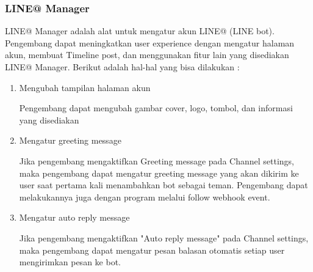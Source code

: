 \subsubsection{LINE@ Manager}
LINE@ Manager adalah alat untuk mengatur akun LINE@ (LINE bot). Pengembang dapat meningkatkan user experience dengan mengatur halaman akun, membuat Timeline post, dan menggunakan fitur lain yang disediakan LINE@ Manager. Berikut adalah hal-hal yang bisa dilakukan :
\begin{enumerate}
\item Mengubah tampilan halaman akun

Pengembang dapat mengubah gambar cover, logo, tombol, dan informasi yang disediakan

\item Mengatur greeting message

Jika pengembang mengaktifkan Greeting message pada Channel settings, maka pengembang dapat mengatur greeting message yang akan dikirim ke user saat pertama kali menambahkan bot sebagai teman. Pengembang dapat melakukannya juga dengan program melalui follow webhook event.

\item Mengatur auto reply message

Jika pengembang mengaktifkan "Auto reply message" pada Channel settings, maka pengembang dapat mengatur pesan balasan otomatis setiap user mengirimkan pesan ke bot.
\end{enumerate}
